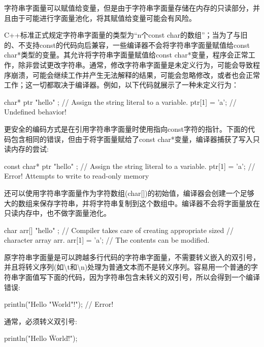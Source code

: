 字符串字面量可以赋值给变量，但是由于字符串字面量存储在内存的只读部分，并且由于可能进行字面量池化，将其赋值给变量可能会有风险。

C++标准正式规定字符串字面量的类型为“n个const char的数组”；当为了与旧的、不支持const的代码向后兼容，一些编译器不会将字符串字面量赋值给const char*类型的变量。其允许将字符串字面量赋值给const char*变量，程序会正常工作，除非尝试更改字符串。通常，修改字符串字面量是未定义行为，可能会导致程序崩溃，可能会继续工作并产生无法解释的结果，可能会忽略修改，或者也会正常工作；这一切都取决于编译器。例如，以下代码就展示了一种未定义行为：

\begin{cpp}
char* ptr { "hello" }; // Assign the string literal to a variable.
ptr[1] = 'a'; // Undefined behavior!
\end{cpp}

更安全的编码方式是在引用字符串字面量时使用指向const字符的指针。下面的代码包含相同的错误，但由于将字面量赋给了const char*变量，编译器捕获了写入只读内存的尝试:

\begin{cpp}
const char* ptr { "hello" }; // Assign the string literal to a variable.
ptr[1] = 'a'; // Error! Attempts to write to read-only memory
\end{cpp}

还可以使用字符串字面量作为字符数组(char[])的初始值，编译器会创建一个足够大的数组来保存字符串，并将字符串复制到这个数组中。编译器不会将字面量放在只读内存中，也不做字面量池化。

\begin{cpp}
char arr[] { "hello" }; // Compiler takes care of creating appropriate sized
                        // character array arr.
arr[1] = 'a'; // The contents can be modified.
\end{cpp}


原字符串字面量是可以跨越多行代码的字符串字面量，不需要转义嵌入的双引号，并且将转义序列(如\textbackslash{}t和\textbackslash{}n)处理为普通文本而不是转义序列。容易用一个普通的字符串字面值写下面的代码，因为字符串包含未转义的双引号，所以会得到一个编译错误:

\begin{cpp}
println("Hello "World"!"); // Error!
\end{cpp}

通常，必须转义双引号:

\begin{cpp}
println("Hello \"World\"!");
\end{cpp}

